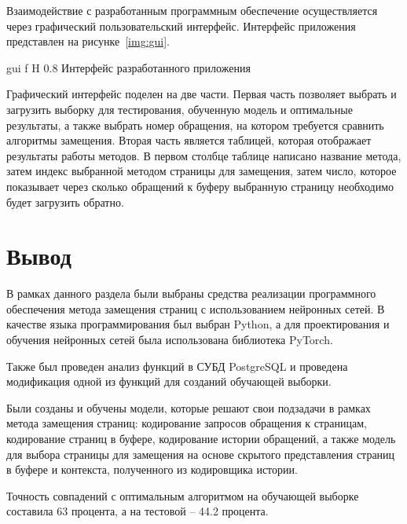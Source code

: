 Взаимодействие с разработанным программным обеспечение осуществляется через графический пользовательский интерфейс. Интерфейс приложения представлен на рисунке~\ref{img:gui}.

{gui} %
{f} %
{H} %
{0.8\textwidth} %
{Интерфейс разработанного приложения} %


Графический интерфейс поделен на две части.
Первая часть позволяет выбрать и загрузить выборку для тестирования, обученную модель и оптимальные результаты, а также выбрать номер обращения, на котором требуется сравнить алгоритмы замещения.
Вторая часть является таблицей, которая отображает результаты работы методов.
В первом столбце таблице написано название метода, затем индекс выбранной методом страницы для замещения, затем число, которое показывает через сколько обращений к буферу выбранную страницу необходимо будет загрузить обратно.

\section{Вывод}

В рамках данного раздела были выбраны средства реализации программного обеспечения метода замещения страниц с использованием нейронных сетей.
В качестве языка программирования был выбран Python, а для проектирования и обучения нейронных сетей была использована библиотека PyTorch. 

Также был проведен анализ функций в СУБД PostgreSQL и проведена модификация одной из функций для созданий обучающей выборки.

Были созданы и обучены модели, которые решают свои подзадачи в рамках метода замещения страниц: кодирование запросов обращения к страницам, кодирование страниц в буфере, кодирование истории обращений, а также модель для выбора страницы для замещения на основе скрытого представления страниц в буфере и контекста, полученного из кодировщика истории.

Точность совпадений с оптимальным алгоритмом на обучающей выборке составила 63 процента, а на тестовой -- 44.2 процента.